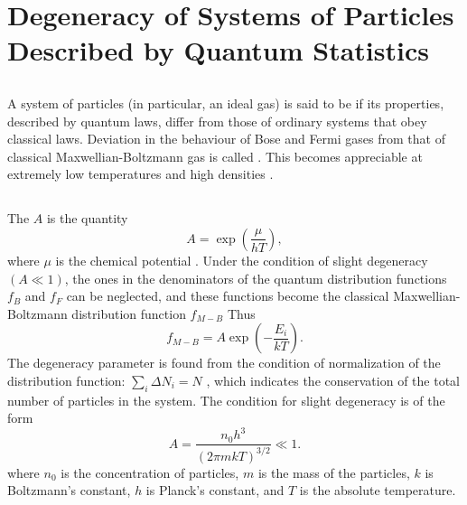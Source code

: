 \section[Degeneracy of Systems]{Degeneracy of Systems of Particles Described by Quantum Statistics}
\label{sec-41.3} 

\subsection{}\label{41.3.1} A system of particles (in particular, an ideal gas) is said to be  if its properties, described by quantum laws, differ from those of ordinary systems that obey classical laws. Deviation in the behaviour of Bose and Fermi gases from that of classical Maxwellian-Boltzmann gas is called .
This becomes appreciable at extremely low temperatures and high densities .

\subsection{}\label{41.3.2} The  $A$ is the quantity
\begin{equation*}%
A = \exp \left( \frac{\mu}{hT}\right),
\end{equation*}
where $\mu$ is the chemical potential . Under the condition of slight degeneracy $(A \ll 1)$, the ones in the denominators of the quantum distribution functions $f_{B}$ and $f_{F}$ can be neglected, and these functions become the classical Maxwellian-Boltzmann distribution function $f_{M\! - \!B}$ Thus
\begin{equation*}%
f_{M\! - \!B} = A \exp \left(- \frac{E_{i}}{kT}\right).
\end{equation*}
The degeneracy parameter is found from the condition of normalization of the distribution function: $\sum_{i} \Delta N_{i} = N$ , which indicates the conservation of the total number of particles in the system. The condition for slight degeneracy is of the form 
\begin{equation*}%
A = \frac{n_{0}h^{3}}{(2 \pi m kT)^{3/2}} \ll 1.
\end{equation*}
where $n_{0}$ is the concentration of particles, $m$ is the mass of the particles, $k$ is Boltzmann's constant, $h$ is Planck's constant, and $T$ is the absolute temperature.

